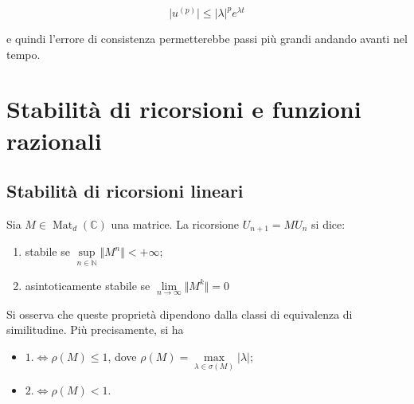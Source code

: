 \documentclass[hidelinks, 10pt]{report}
\DeclareMathOperator{\Mat}{Mat}
\begin{document}
\[ \vert u^{(p)} \vert \le \vert \lambda \vert^{p} e^{\lambda t} \]

e quindi l'errore di consistenza permetterebbe passi pi\`u grandi andando avanti nel tempo.

\section{Stabilit\`a di ricorsioni e funzioni razionali}
\subsection{Stabilit\`a di ricorsioni lineari}

Sia $ M \in \Mat_{d}(\mathbb{C}) $ una matrice. La ricorsione $ U_{n + 1} = M U_{n} $ si dice:
\begin{enumerate}
\item stabile se $ \sup\limits_{n \in \mathbb{N}} \Vert M^{n} \Vert < +\infty $;
\item asintoticamente stabile se $ \lim\limits_{n \to \infty} \Vert M^{k} \Vert = 0 $
\end{enumerate}

Si osserva che queste propriet\`a dipendono dalla classi di equivalenza di similitudine. Pi\`u precisamente, si ha 

\begin{itemize}
\item $ 1. \iff \rho (M) \le 1 $, dove $ \rho(M) = \max\limits_{\lambda \in \sigma(M)} \vert \lambda \vert $;
\item $ 2. \iff \rho (M) < 1 $.
\end{itemize}
\end{document}
